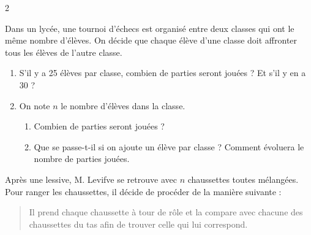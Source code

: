 \documentclass[10pt,a4paper]{article}
\begin{document}
\begin{multicols}{2}
    \begin{exo}[][appro]
        Dans un lycée, une tournoi d'échecs est organisé entre deux classes qui ont le même nombre d'élèves. \medbreak
        On décide que chaque élève d'une classe doit affronter tous les élèves de l'autre classe.
        \begin{enumerate}
            \item S'il y a 25 élèves par classe, combien de parties seront jouées ? Et s'il y en a 30 ?
            \item On note \(n\) le nombre d'élèves dans la classe.  \begin{enumerate}
                \item Combien de parties seront jouées ?
                \item Que se passe-t-il si on ajoute un élève par classe ? Comment évoluera le nombre de parties jouées.
            \end{enumerate} 
        \end{enumerate}
    \end{exo}

    \begin{exo}[][avance]
        Après une lessive, M. Levifve se retrouve avec \(n\) chaussettes toutes mélangées. \medbreak
        Pour ranger les chaussettes, il décide de procéder de la manière suivante : 

        \begin{quote}
        Il prend chaque chaussette à tour de rôle et la compare avec chacune des chaussettes du tas afin de trouver celle qui lui correspond.
        \end{quote}


\end{exo}
\end{multicols}
\end{document}

